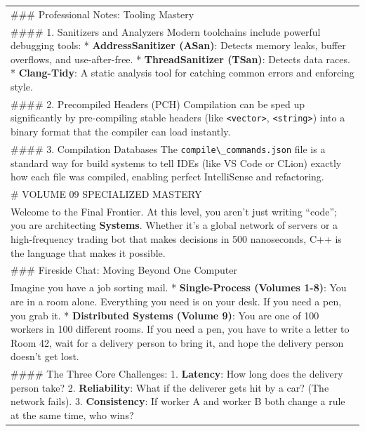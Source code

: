 \begin{longtable}[]{@{}
  >{\raggedright\arraybackslash}p{}@{}}
\toprule
\endhead
\#\#\# Professional Notes: Tooling Mastery \\
\#\#\#\# 1. Sanitizers and Analyzers Modern toolchains include powerful
debugging tools: * \textbf{AddressSanitizer (ASan)}: Detects memory
leaks, buffer overflows, and use-after-free. * \textbf{ThreadSanitizer
(TSan)}: Detects data races. * \textbf{Clang-Tidy}: A static analysis
tool for catching common errors and enforcing style. \\
\#\#\#\# 2. Precompiled Headers (PCH) Compilation can be sped up
significantly by pre-compiling stable headers (like
\passthrough{\lstinline!<vector>!}, \passthrough{\lstinline!<string>!})
into a binary format that the compiler can load instantly. \\
\#\#\#\# 3. Compilation Databases The
\passthrough{\lstinline!compile\_commands.json!} file is a standard way
for build systems to tell IDEs (like VS Code or CLion) exactly how each
file was compiled, enabling perfect IntelliSense and refactoring. \\
\# VOLUME 09 SPECIALIZED MASTERY \\
Welcome to the Final Frontier. At this level, you aren't just writing
``code''; you are architecting \textbf{Systems}. Whether it's a global
network of servers or a high-frequency trading bot that makes decisions
in 500 nanoseconds, C++ is the language that makes it possible. \\
\#\#\# Fireside Chat: Moving Beyond One Computer \\
Imagine you have a job sorting mail. * \textbf{Single-Process (Volumes
1-8)}: You are in a room alone. Everything you need is on your desk. If
you need a pen, you grab it. * \textbf{Distributed Systems (Volume 9)}:
You are one of 100 workers in 100 different rooms. If you need a pen,
you have to write a letter to Room 42, wait for a delivery person to
bring it, and hope the delivery person doesn't get lost. \\
\#\#\#\# The Three Core Challenges: 1. \textbf{Latency}: How long does
the delivery person take? 2. \textbf{Reliability}: What if the deliverer
gets hit by a car? (The network fails). 3. \textbf{Consistency}: If
worker A and worker B both change a rule at the same time, who wins? \\
\bottomrule
\end{longtable}
